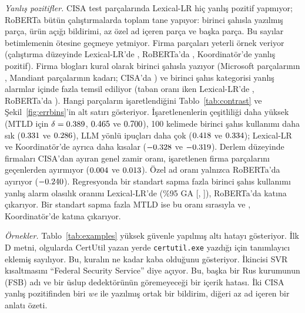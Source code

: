 \documentclass[journal]{IEEEtran}
\begin{document}
\emph{Yanlış pozitifler.} CISA test parçalarında Lexical-LR hiç yanlış pozitif yapmıyor; RoBERTa bütün
çalıştırmalarda toplam \ErrtotalFpCisaTrans{} tane yapıyor: birinci şahısla yazılmış \ErrNFpCisaFirstPersonTrans{}
parça, \ErrNFpCisaProductVulnerabilityNoticeTrans{} ürün açığı bildirimi, az özel ad içeren
\ErrNFpCisaFewProperNounsTrans{} parça ve \ErrNFpCisaOtherTrans{} başka parça. Bu sayılar betimlemenin ötesine
geçmeye yetmiyor. Firma parçaları yeterli örnek veriyor (çalıştırma düzeyinde Lexical-LR'de
\ErrtotalFpVendorsLexlr{}, RoBERTa'da \ErrtotalFpVendorsTrans{}, Koordinatör'de \ErrtotalFpVendorsCoord{} yanlış
pozitif). Firma blogları kural olarak birinci şahısla yazıyor (Microsoft parçalarının \ProfpctMicrosoftFirst{},
Mandiant parçalarının \ProfpctMandiantFirst{} kadarı; CISA'da \ProfpctHumanFirst{}) ve birinci şahıs kategorisi
yanlış alarmlar içinde fazla temsil ediliyor (taban oranı \ErrbaseFpVendorsFirstPerson{} iken Lexical-LR'de
\ErrFpVendorsFirstPersonLexlr{}, RoBERTa'da \ErrFpVendorsFirstPersonTrans{}). Hangi parçaların işaretlendiğini
Tablo~\ref{tab:contrast} ve Şekil~\ref{fig:errbins}'in alt satırı gösteriyor. İşaretlenenlerin çeşitliliği daha
yüksek (MTLD için $\delta = 0.389$, $0.465$ ve $0.700$), 100 kelimede birinci
şahıs kullanımı daha sık ($0.331$ ve $0.286$), LLM yönlü ipuçları daha çok
($0.418$ ve $0.334$); Lexical-LR ve Koordinatör'de ayrıca daha kısalar
($-0.328$ ve $-0.319$). Derlem düzeyinde firmaları CISA'dan ayıran genel zamir oranı,
işaretlenen firma parçalarını geçenlerden ayırmıyor ($0.004$ ve $0.013$). Özel ad
oranı yalnızca RoBERTa'da ayırıyor ($-0.240$). Regresyonda bir standart sapma fazla birinci şahıs
kullanımı yanlış alarm olasılık oranını Lexical-LR'de \FpOrLexlrFirstRate{} (\%95 GA [\FpOrLoLexlrFirstRate{},
\FpOrHiLexlrFirstRate{}]), RoBERTa'da \FpOrTransFirstRate{} katına çıkarıyor. Bir standart sapma fazla MTLD ise
bu oranı sırasıyla \FpOrLexlrMtld{} ve \FpOrTransMtld{}, Koordinatör'de \FpOrCoordMtld{} katına çıkarıyor.

\emph{Örnekler.} Tablo~\ref{tab:examples} yüksek güvenle yapılmış altı hatayı gösteriyor. İlk D metni, olgularda
CertUtil yazan yerde \texttt{certutil.exe} yazdığı için tanımlayıcı eklemiş sayılıyor. Bu, kuralın ne kadar kaba
olduğunu gösteriyor. İkincisi SVR kısaltmasını ``Federal Security Service'' diye açıyor. Bu, başka bir Rus
kurumunun (FSB) adı ve bir üslup dedektörünün göremeyeceği bir içerik hatası. İki CISA yanlış pozitifinden biri
\emph{we} ile yazılmış ortak bir bildirim, diğeri az ad içeren bir anlatı özeti.
\end{document}

